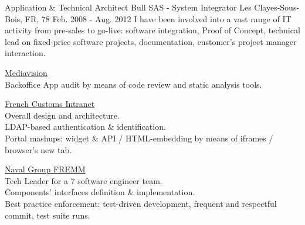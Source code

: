 \begin{cventries}
  \cventry
    {Application \& Technical Architect} %
    {Bull SAS - System Integrator} %
    {Les Clayes-Sous-Bois, FR, 78} %
    {Feb. 2008 - Aug. 2012} %
{
I have been involved into a vast range of IT activity from pre-sales to go-live: software integration, Proof of Concept, technical lead on fixed-price software projects, documentation, customer’s project manager interaction.
} %
{
      \begin{cvitems} %
        \item {\href{http://www.mediavision.fr}{Mediavision}\\Backoffice App audit by means of code review and static analysis tools.}
        \item {\href{http://www.douane.gouv.fr/articles/a13408-travel-coming-to-france-with-your-pet}{French Customs Intranet}\\Overall design and architecture.\\LDAP-based authentication \& identification.\\Portal mashups: widget \& API / HTML-embedding by means of iframes / browser's new tab.}
        \item {\href{https://www.naval-group.com/en/news/dcns-delivers-multi-mission-frigate-auvergne-the-fourth-fremm-for-the-french-navy/}{Naval Group FREMM}\\Tech Leader for a 7 software engineer team.\\Components’ interfaces definition \& implementation.\\Best practice enforcement: test-driven development, frequent and respectful commit, test suite runs.}
      \end{cvitems}
} %


\end{cventries}
